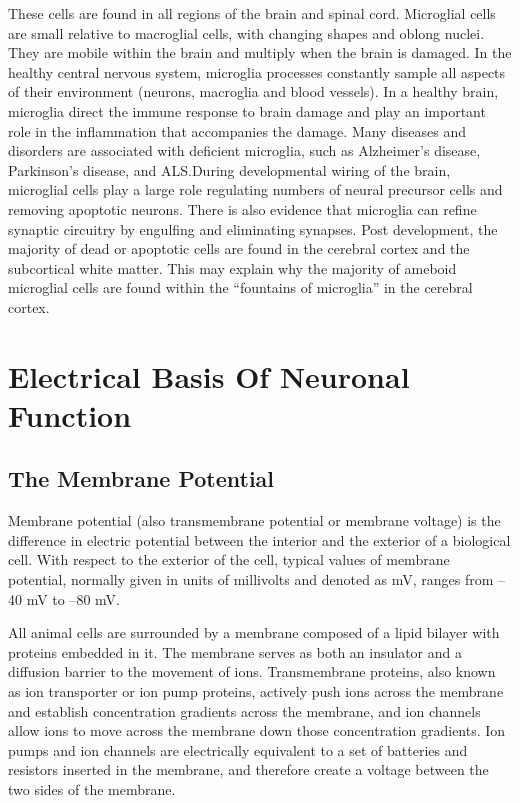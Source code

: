 These cells are found in all regions of the brain and spinal cord. Microglial cells are small relative to macroglial cells, with changing shapes and oblong nuclei. They are mobile within the brain and multiply when the brain is damaged. In the healthy central nervous system, microglia processes constantly sample all aspects of their environment (neurons, macroglia and blood vessels). In a healthy brain, microglia direct the immune response to brain damage and play an important role in the inflammation that accompanies the damage. Many diseases and disorders are associated with deficient microglia, such as Alzheimer's disease, Parkinson's disease, and ALS.During developmental wiring of the brain, microglial cells play a large role regulating numbers of neural precursor cells and removing apoptotic neurons. There is also evidence that microglia can refine synaptic circuitry by engulfing and eliminating synapses. Post development, the majority of dead or apoptotic cells are found in the cerebral cortex and the subcortical white matter. This may explain why the majority of ameboid microglial cells are found within the ``fountains of microglia'' in the cerebral cortex.

\hypertarget{electrical-basis-of-neuronal-function}{%
\chapter{Electrical Basis Of Neuronal Function}\label{electrical-basis-of-neuronal-function}}

\hypertarget{the-membrane-potential}{%
\section{The Membrane Potential}\label{the-membrane-potential}}

Membrane potential (also transmembrane potential or membrane voltage) is the difference in electric potential between the interior and the exterior of a biological cell. With respect to the exterior of the cell, typical values of membrane potential, normally given in units of millivolts and denoted as mV, ranges from --40 mV to --80 mV.

All animal cells are surrounded by a membrane composed of a lipid bilayer with proteins embedded in it. The membrane serves as both an insulator and a diffusion barrier to the movement of ions. Transmembrane proteins, also known as ion transporter or ion pump proteins, actively push ions across the membrane and establish concentration gradients across the membrane, and ion channels allow ions to move across the membrane down those concentration gradients. Ion pumps and ion channels are electrically equivalent to a set of batteries and resistors inserted in the membrane, and therefore create a voltage between the two sides of the membrane.

